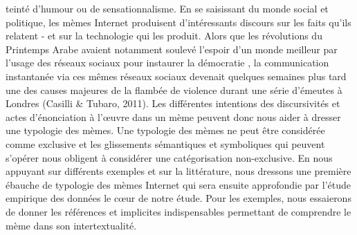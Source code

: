 teinté d{\textquoteright}humour ou de sensationnalisme. En se
saisissant du monde social et politique, les mèmes Internet
produisent d{\textquoteright}intéressants discours sur les faits
qu{\textquoteright}ils relatent - et sur la technologie qui les
produit. Alors que les révolutions du Printemps Arabe avaient
notamment soulevé l{\textquoteright}espoir d{\textquoteright}un monde
meilleur par l{\textquoteright}usage des réseaux sociaux pour
instaurer la démocratie \citep{Lotan2011}, la communication
instantanée via ces mêmes réseaux sociaux devenait quelques
semaines plus tard une des causes majeures de la flambée de violence
durant une série d{\textquoteright}émeutes à Londres (Casilli \&
Tubaro, 2011). Les différentes intentions des discursivités et
actes d{\textquoteright}énonciation à l{\textquoteright}{\oe}uvre
dans un mème peuvent donc nous aider à dresser une typologie des
mèmes. Une typologie des mèmes ne peut être considérée comme
exclusive et les glissements sémantiques et symboliques qui peuvent
s{\textquoteright}opérer nous obligent à considérer une
catégorisation non-exclusive. En nous appuyant sur différents
exemples et sur la littérature, nous dressons une première
ébauche de typologie des mèmes Internet qui sera ensuite
approfondie par l{\textquoteright}étude empirique des données le
c{\oe}ur de notre étude. Pour les exemples, nous essaierons de donner
les références et implicites indispensables permettant de
comprendre le mème dans son intertextualité.

